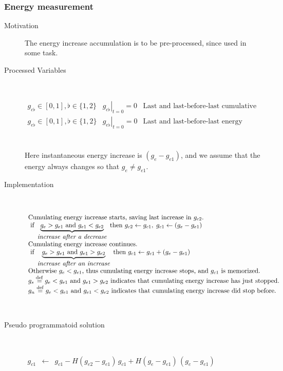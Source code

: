 \documentclass[a4]{article}
\newcommand{\eqline}[1]{~\vspace{0.1cm}\\\centerline{$#1$}\vspace{0.1cm}\\}
\newcommand{\defq}{\stackrel {\rm def}{=}}
\begin{document}
\subsubsection{Energy measurement}\begin{description}
 \item[Motivation] The energy increase accumulation is to be pre-processed, since used in some task.
 \item[Processed Variables] 
\eqline{\begin{array}{lll}
  g_{c\flat} \in [0, 1], \flat \in \{1, 2\} &\left.g_{c\flat} \right|_{t = 0} = 0 & \mbox{Last and last-before-last cumulative energy increases.}\\
  g_{e\flat} \in [0, 1], \flat \in \{1, 2\} &\left.g_{e\flat} \right|_{t = 0} = 0 & \mbox{Last and last-before-last energy value.} \\
\end{array}}
Here instantaneous energy increase is $(g_{e} - g_{e1})$, and we assume that the energy always changes so that $g_{e} \ne g_{e1}$.
\item[Implementation] \eqline{\begin{array}{l}
    \mbox{Cumulating energy increase starts, saving last increase in $g_{c2}$.} \\
    \mbox{ if } \underbrace{g_{e} > g_{e1}  \mbox{ and } g_{e1} < g_{e2}}_{\mbox{\em increase after a decrease}} \mbox{ then } g_{c2} \leftarrow g_{c1}, \; g_{c1} \leftarrow (g_{e} - g_{e1}) \\
    \mbox{Cumulating energy increase continues.} \\
    \mbox{ if } \underbrace{g_{e} > g_{e1}  \mbox{ and } g_{e1} > g_{e2}}_{\mbox{\em increase after an increase}}  \mbox{ then } g_{c1} \leftarrow g_{c1} + (g_{e} - g_{e1}) \\
    \mbox{Otherwise $g_{e} < g_{e1}$, thus cumulating energy increase stops, and $g_{c1}$ is memorized.} \\
    g_s \defq g_{e} < g_{e1}  \mbox{ and } g_{e1} > g_{e2} \mbox{ indicates that cumulating energy increase has just stopped.} \\
    g_n \defq g_{e} < g_{e1}  \mbox{ and } g_{e1} < g_{e2} \mbox{ indicates that cumulating energy increase did stop before.} \\
  \end{array}}
\item[Pseudo programmatoid solution] \eqline{\begin{array}{rcl}
   g_{c1} &\leftarrow& g_{c1} - H(g_{e2} - g_{e1}) \, g_{c1} + H(g_{e} - g_{e1}) \, (g_{e} - g_{e1}) \\

\end{array}}
\end{description}
\end{document}
